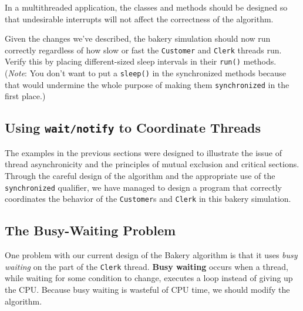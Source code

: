 
\noindent In a multithreaded application, the classes and
methods should be designed so that undesirable interrupts will
not affect the correctness of the algorithm.


\begin{SSTUDY}

\item  Given the changes we've described, the bakery simulation should now
run correctly regardless of how slow or fast the {\tt Customer} and
{\tt Clerk} threads run.  Verify this by placing different-sized sleep
intervals in their {\tt run()} methods.  ({\it Note}: You don't want to
put a {\tt sleep()} in the synchronized methods because that would
undermine the whole purpose of making them {\tt synchronized} in the
first place.)
\end{SSTUDY}


\subsection{Using {\tt wait/notify} to Coordinate Threads}
\noindent The examples in the previous sections were designed to illustrate the
issue of thread asynchronicity and the principles of mutual exclusion
and critical sections.  Through the careful design of the algorithm and
the appropriate use of the {\tt synchronized} qualifier, we have
managed to design a program that correctly coordinates the behavior of
the {\tt Customer}s and {\tt Clerk} in this bakery simulation.

\subsection*{The Busy-Waiting Problem}
\noindent One problem with our current design of the Bakery algorithm is that it
uses {\em busy waiting} 
 on the part of the {\tt Clerk} thread. {\bf
Busy waiting} occurs when a thread, while waiting for some condition
to change, executes a loop instead of giving up the CPU.  Because busy
waiting is wasteful of CPU time, we should modify the algorithm.

